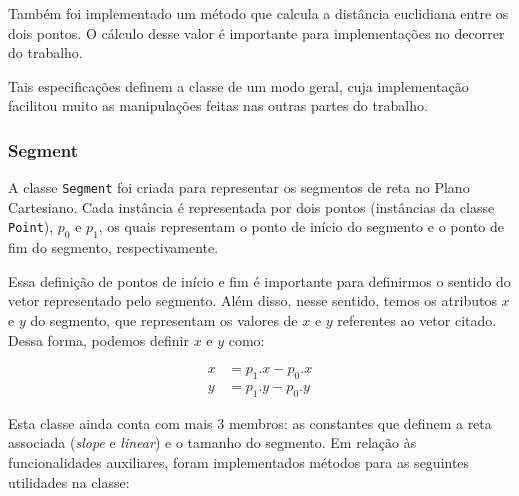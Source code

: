 \documentclass{article}
\begin{document}
Também foi implementado um método que calcula a distância euclidiana entre os dois pontos. O cálculo desse valor é importante para implementações no decorrer do trabalho.

Tais especificações definem a classe de um modo geral, cuja implementação facilitou muito as manipulações feitas nas outras partes do trabalho.

\subsubsection{Segment}

A classe \texttt{Segment} foi criada para representar os segmentos de reta no Plano Cartesiano. Cada instância é representada por dois pontos (instâncias da classe \texttt{Point}), \( p_0 \) e \( p_1 \), os quais representam o ponto de início do segmento e o ponto de fim do segmento, respectivamente.

Essa definição de pontos de início e fim é importante para definirmos o sentido do vetor representado pelo segmento. Além disso, nesse sentido, temos os atributos \( x \) e \( y \) do segmento, que representam os valores de \( x \) e \( y \) referentes ao vetor citado. Dessa forma, podemos definir \( x \) e \( y \) como:

\begin{align*}
	x & = p_1.x - p_0.x \\
	y & = p_1.y - p_0.y
\end{align*}

Esta classe ainda conta com mais 3 membros: as constantes que definem a reta associada (\textit{slope} e \textit{linear}) e o tamanho do segmento. Em relação às funcionalidades auxiliares, foram implementados métodos para as seguintes utilidades na classe:
\end{document}
